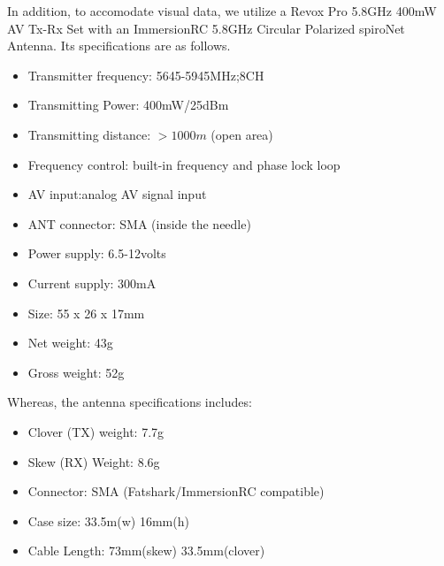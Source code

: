 \documentclass[a4paper, 10pt, twocolumn, titlepage]{article}
\begin{document}
In addition, to accomodate visual data, we utilize a Revox Pro 5.8GHz 400mW AV Tx-Rx Set with an ImmersionRC 5.8GHz Circular Polarized spiroNet Antenna.
Its specifications are as follows.
\begin{itemize}
\itemsep-1mm
  \item Transmitter frequency: 5645-5945MHz;8CH
  \item Transmitting Power: 400mW/25dBm
  \item Transmitting distance: $>1000m$ (open area)
  \item Frequency control: built-in frequency and phase lock loop  
  \item AV input:analog AV signal input 
  \item ANT connector: SMA (inside the needle)
  \item Power supply: 6.5-12volts 
  \item Current supply: 300mA
  \item Size: 55 x 26 x 17mm
  \item Net weight: 43g
  \item Gross weight: 52g
\end{itemize}
Whereas, the antenna specifications includes:
\begin{itemize}
\itemsep-1mm
  \item Clover (TX) weight: 7.7g
  \item Skew (RX) Weight: 8.6g
  \item Connector: SMA (Fatshark/ImmersionRC compatible)
  \item Case size: 33.5m(w) 16mm(h)
  \item Cable Length: 73mm(skew) 33.5mm(clover)
\end{itemize}
\end{document}
